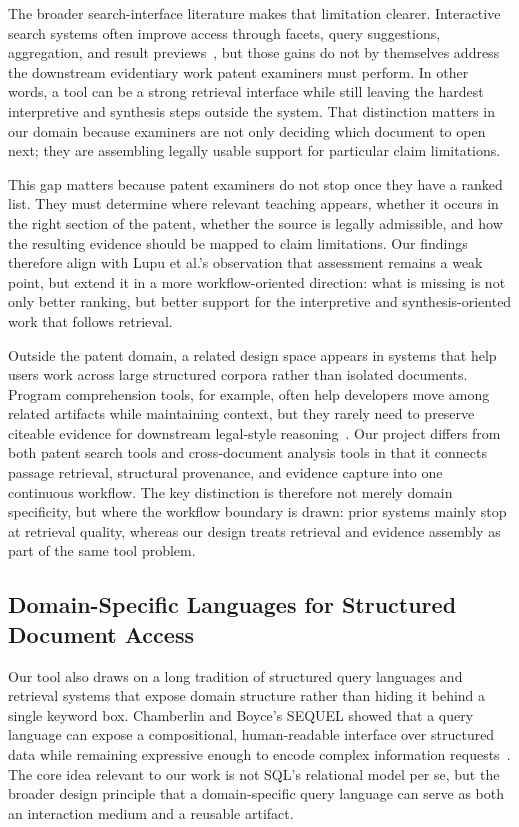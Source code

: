 \documentclass[sigconf]{acmart}
\begin{document}
The broader search-interface literature makes that limitation clearer.
Interactive search systems often improve access through facets, query
suggestions, aggregation, and result previews~\cite{Hearst2009,White2009}, but
those gains do not by themselves address the downstream evidentiary work patent
examiners must perform. In other words, a tool can be a strong retrieval
interface while still leaving the hardest interpretive and synthesis steps
outside the system. That distinction matters in our domain because examiners
are not only deciding which document to open next; they are assembling legally
usable support for particular claim limitations.

This gap matters because patent examiners do not stop once they have a ranked
list. They must determine where relevant teaching appears, whether it occurs in
the right section of the patent, whether the source is legally admissible, and
how the resulting evidence should be mapped to claim limitations. Our findings
therefore align with Lupu et al.'s observation that assessment remains a weak
point, but extend it in a more workflow-oriented direction: what is missing is
not only better ranking, but better support for the interpretive and
synthesis-oriented work that follows retrieval.

Outside the patent domain, a related design space appears in systems that help
users work across large structured corpora rather than isolated documents.
Program comprehension tools, for example, often help developers move among
related artifacts while maintaining context, but they rarely need to preserve
citeable evidence for downstream legal-style reasoning~\cite{Ko2006,Storey1999}.
Our project differs from both patent search tools and cross-document analysis
tools in that it connects passage retrieval, structural provenance, and
evidence capture into one continuous workflow. The key distinction is therefore
not merely domain specificity, but where the workflow boundary is drawn: prior
systems mainly stop at retrieval quality, whereas our design treats retrieval
and evidence assembly as part of the same tool problem.

\subsection{Domain-Specific Languages for Structured Document Access}

Our tool also draws on a long tradition of structured query languages and
retrieval systems that expose domain structure rather than hiding it behind a
single keyword box. Chamberlin and Boyce's SEQUEL showed that a query language
can expose a compositional, human-readable interface over structured data while
remaining expressive enough to encode complex information requests~\cite{Chamberlin1974}.
The core idea relevant to our work is not SQL's relational model per se, but
the broader design principle that a domain-specific query language can serve as
both an interaction medium and a reusable artifact.
\end{document}
